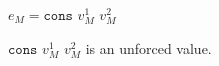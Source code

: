 \begin{case}

$e_{M}=\mathtt{cons}$ $v_{M}^{1}$ $v_{M}^{2}$

$\mathtt{cons}$ $v_{M}^{1}$ $v_{M}^{2}$ is an unforced value.

\end{case}